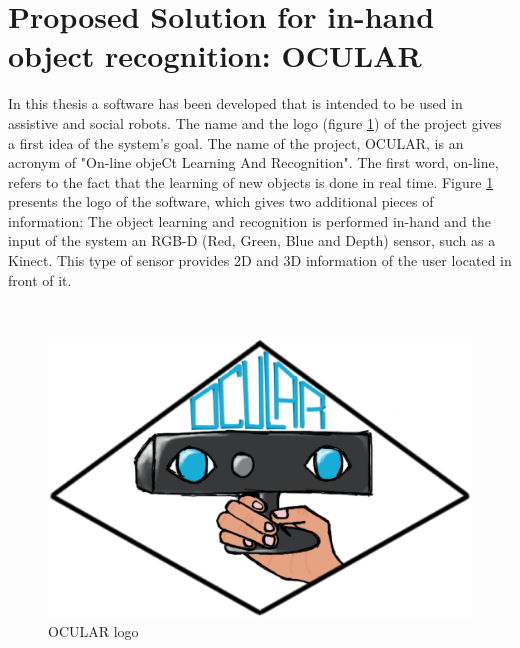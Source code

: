 \section{Proposed Solution for in-hand object recognition: OCULAR}

In this thesis a software has been developed that is intended to be used in assistive and social robots.
The name and the logo (figure \ref{ocular_logo}) of the project gives a first idea of the system's goal. 
The name of the project, OCULAR, is an acronym of "On-line objeCt Learning And Recognition". 
The first word, on-line, refers to the fact that the learning of new objects is done in real time. %
Figure \ref{ocular_logo} presents the logo of the software, which gives two additional pieces of information: 
The object learning and recognition is performed in-hand and the input of the system an RGB-D (Red, Green, Blue and Depth) sensor, such as a Kinect. 
This type of sensor provides 2D and 3D information of the user located in front of it. 

\\

\begin{figure}[H]
	\begin{center}
\includegraphics[scale=0.3]{img/ocular_logo.eps}
	\caption[OCULAR Logo]{OCULAR logo}
		\label{ocular_logo}
	\end{center}
\end{figure}

